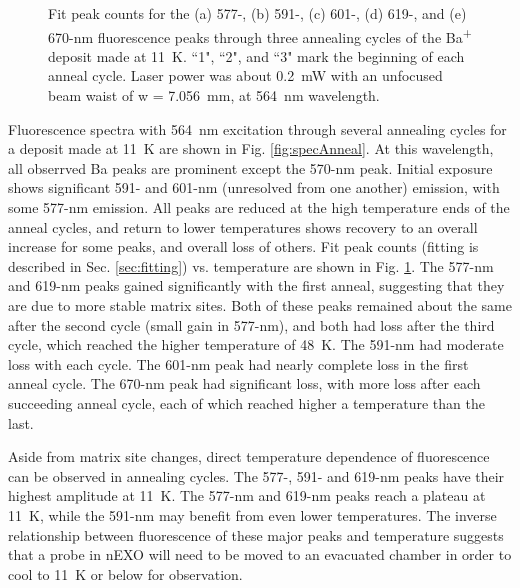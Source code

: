 \begin{figure}
                \caption{Fit peak counts for the (a) 577-, (b) 591-, (c) 601-, (d) 619-, and (e) 670-nm fluorescence peaks through three annealing cycles of the Ba\textsuperscript{+} deposit made at 11~K.  ``1", ``2", and ``3" mark the beginning of each anneal cycle.  Laser power was about 0.2~mW with an unfocused beam waist of w = 7.056~mm, at 564~nm wavelength.}
\label{fig:annealGrn}
\end{figure}

Fluorescence spectra with 564~nm excitation through several annealing cycles for a deposit made at 11~K are shown in Fig. \ref{fig:specAnneal}.  At this wavelength, all obserrved Ba peaks are prominent except the 570-nm peak.  Initial exposure shows significant 591- and 601-nm (unresolved from one another) emission, with some 577-nm emission.  All peaks are reduced at the high temperature ends of the anneal cycles, and return to lower temperatures shows recovery to an overall increase for some peaks, and overall loss of others.  Fit peak counts (fitting is described in Sec. \ref{sec:fitting}) vs. temperature are shown in Fig. \ref{fig:annealGrn}.  The 577-nm and 619-nm peaks gained significantly with the first anneal, suggesting that they are due to more stable matrix sites.  Both of these peaks remained about the same after the second cycle (small gain in 577-nm), and both had loss after the third cycle, which reached the higher temperature of 48~K.  The 591-nm had moderate loss with each cycle.  The 601-nm peak had nearly complete loss in the first anneal cycle.  The 670-nm peak had significant loss, with more loss after each succeeding anneal cycle, each of which reached higher a temperature than the last.



Aside from matrix site changes, direct temperature dependence of fluorescence can be observed in annealing cycles.  The 577-, 591- and 619-nm peaks have their highest amplitude at 11~K.  The 577-nm and 619-nm peaks reach a plateau at 11~K, while the 591-nm may benefit from even lower temperatures.  The inverse relationship between fluorescence of these major peaks and temperature suggests that a probe in nEXO will need to be moved to an evacuated chamber in order to cool to 11~K or below for observation.  


